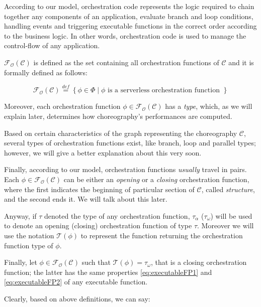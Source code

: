 \documentclass[12pt,a4paper]{report}
\newcommand{\mathDef}{\overset{\textit{def}}{=}}
\theoremstyle{definition}
\begin{document}
\begin{itemize}
	According to our model, orchestration code represents the logic required to chain together any components of an application, evaluate branch and loop conditions, handling events and triggering executable functions in the correct order according to the business logic. In other words, orchestration code is used to manage the control-flow of any application.
	
	$\mathscr{F_O}(\mathcal{C})$ is defined as the set containing all orchestration functions of $\mathcal{C}$ and it is formally defined as follows:
	
	\begin{equation}
		\mathscr{F_O}(\mathcal{C}) \mathDef \left\lbrace \phi \in \Phi \mid \phi \text{ is a serverless orchestration function }\right\rbrace 
	\end{equation}

	Moreover, each orchestration function $\phi \in \mathscr{F_O}(\mathcal{C})$ has a \textit{type}, which, as we will explain later, determines how choreography's performances are computed. 
	
	Based on certain characteristics of the graph representing the choreography $\mathcal{C}$, several types of orchestration functions exist, like branch, loop and parallel types; however, we will give a better explanation about this very soon.

	Finally, according to our model, orchestration functions \textit{usually} travel in pairs. Each $\phi \in \mathscr{F_O}(\mathcal{C})$ can be either an \textit{opening} or a \textit{closing} orchestration function, where the first indicates the beginning of particular section of $\mathcal{C}$, called \textit{structure}, and the second ends it.	We will talk about this later.
	
	Anyway, if $\tau$ denoted the type of any orchestration function, $\tau_{\alpha}$ ($\tau_{\omega}$) will be used to denote an opening (closing) orchestration function of type $\tau$. Moreover we will use the notation $\mathscr{T}(\phi)$ to represent the function returning the orchestration function type of $\phi$.
	
	Finally, let $\phi \in \mathscr{F_O}(\mathcal{C})$ such that $\mathscr{T}(\phi) = \tau_{\omega}$, that is a closing orchestration function; the latter has the same properties \ref{eq:executableFP1} and \ref{eq:executableFP2} of any executable function.
	
\end{itemize}

Clearly, based on above definitions, we can say: 
\end{document}
